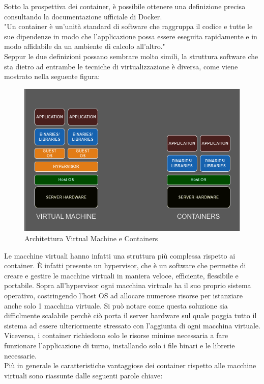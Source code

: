 Sotto la prospettiva dei container, è possibile ottenere una definizione precisa consultando la documentazione ufficiale di Docker\cite{docker-container}.\\
"Un container è  un'unità standard di software che raggruppa il codice e tutte le sue dipendenze in modo che l'applicazione possa essere eseguita rapidamente e in modo affidabile da un ambiente di calcolo all'altro."\\

Seppur le due definizioni possano sembrare molto simili, la struttura software che sta dietro ad entrambe le tecniche di virtualizzazione è diversa, come viene mostrato nella seguente figura:\\


\begin{figure}[h]  %
    \centering
    \includegraphics[width=1\textwidth]{VMvsContainers.png}  %
    \caption{Architettura Virtual Machine e Containers}
    \label{fig:VMvsContainers}
\end{figure}
 
Le macchine virtuali hanno infatti una struttura più complessa rispetto ai container. È infatti presente un hypervisor\cite{hypervisor}, che è un software che permette di creare e gestire le macchine virtuali in maniera veloce, efficiente, flessibile e portabile.
Sopra all'hypervisor ogni macchina virtuale ha il suo proprio sistema operativo, costringendo l'host OS ad allocare numerose risorse per istanziare anche solo 1 macchina virtuale. Si può notare come questa soluzione sia difficlmente scalabile perchè
ciò porta il server hardware sul quale poggia tutto il sistema ad essere ulteriormente stressato con l'aggiunta di ogni macchina virtuale. Viceversa, i container richiedono solo le risorse minime necessaria a fare funzionare l'applicazione di turno, installando solo i file binari e le librerie necessarie.\\
Più in generale le caratteristiche vantaggiose dei container rispetto alle macchine virtuali sono riassunte dalle seguenti parole chiave:\\


